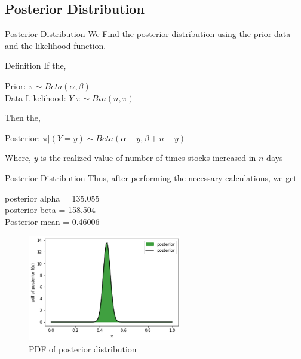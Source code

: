 \documentclass{beamer}
\begin{document}
\begin{frame}
\section{Posterior Distribution}
\end{frame}
\begin{frame}{Posterior Distribution}
   We Find the posterior distribution using the prior data and the likelihood function. 
   \begin{block}{Definition}
       If the,
       \begin{center}
         Prior: $\pi \sim Beta(\alpha,\beta)$\\
       Data-Likelihood: $Y|\pi \sim Bin(n,\pi)$\\
       \end{center}
       Then the,
       \begin{center}
       Posterior: $\pi|(Y=y) \sim Beta(\alpha + y,\beta + n - y)$  
       \end{center} 
   \end{block}
Where, $y$ is the realized value of number of times stocks increased in $n$ days
\end{frame}
\begin{frame}{Posterior Distribution}
Thus, after performing the necessary calculations, we get 
\begin{center}
\begin{small}
posterior alpha = 135.055\\
posterior beta = 158.504\\
Posterior mean = 0.46006     
\end{small}
\end{center}
\begin{figure}[htp]
\includegraphics[width=0.6\textwidth]{Images/Posterior_Dist.png}
\caption{PDF of posterior distribution}
\end{figure}
\end{frame}
\end{document}
